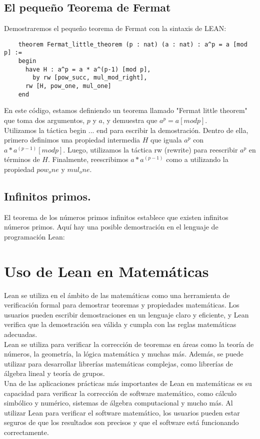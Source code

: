 \documentclass{article}
\begin{document}
\subsection{El pequeño Teorema de Fermat}
Demostraremos el pequeño teorema de Fermat con la sintaxis de LEAN:
\begin{lstlisting}
    theorem Fermat_little_theorem (p : nat) (a : nat) : a^p = a [mod p] :=
    begin
      have H : a^p = a * a^(p-1) [mod p],
        by rw [pow_succ, mul_mod_right],
      rw [H, pow_one, mul_one]
    end
\end{lstlisting}
En este código, estamos definiendo un teorema llamado "Fermat little
theorem" que toma dos argumentos, $p$ y $a$, y demuestra que $a^p = a [mod
			p]$.\\
Utilizamos la táctica begin ... end para escribir la demostración. Dentro
de ella, primero definimos una propiedad intermedia $H$ que iguala $a^p$
con $a * a^(p-1) [mod p]$. Luego, utilizamos la táctica rw (rewrite) para
reescribir $a^p$ en términos de $H$. Finalmente, reescribimos $a * a^(p-1)$
como a utilizando la propiedad $pow_one$ y $mul_one$.

\subsection{Infinitos primos.}
El teorema de los números primos infinitos establece que existen infinitos
números primos. Aquí hay una posible demostración en el lenguaje de
programación Lean:

\section{Uso de Lean en Matemáticas}
Lean se utiliza en el ámbito de las matemáticas como una herramienta de
verificación formal para demostrar teoremas y propiedades matemáticas. Los
usuarios pueden escribir demostraciones en un lenguaje claro y eficiente,
y Lean verifica que la demostración sea válida y cumpla con las reglas
matemáticas adecuadas.\\

Lean se utiliza para verificar la corrección de teoremas en áreas como la
teoría de números, la geometría, la lógica matemática y muchas más.
Además, se puede utilizar para desarrollar librerías matemáticas
complejas, como librerías de álgebra lineal y teoría de grupos.\\

Una de las aplicaciones prácticas más importantes de Lean en matemáticas
es su capacidad para verificar la corrección de software matemático, como
cálculo simbólico y numérico, sistemas de álgebra computacional y mucho
más. Al utilizar Lean para verificar el software matemático, los usuarios
pueden estar seguros de que los resultados son precisos y que el software
está funcionando correctamente.\\
\end{document}
